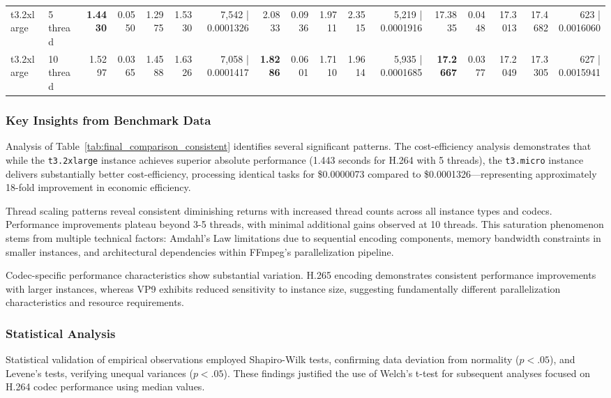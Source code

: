 \documentclass[conference]{IEEEtran}
\begin{document}
\begin{table}[h]
{\begin{tabular}{ll|rrrrr|rrrrr|rrrrr}
				t3.2xlarge & 5 thread & \textbf{1.4430} & 0.0550 & 1.2975 & 1.5330 & 7,542 | 0.0001326 & 2.0833 & 0.0936 & 1.9711 & 2.3515 & 5,219 | 0.0001916 & 17.3835 & 0.0448 & 17.3013 & 17.4682 & 623 | 0.0016060 \\
				t3.2xlarge & 10 thread & 1.5297 & 0.0365 & 1.4588 & 1.6326 & 7,058 | 0.0001417 & \textbf{1.8286} & 0.0601 & 1.7110 & 1.9614 & 5,935 | 0.0001685 & \textbf{17.2667} & 0.0377 & 17.2049 & 17.3305 & 627 | 0.0015941 \\
				\bottomrule
			\end{tabular}
		}
	\end{table}
	
	\subsubsection{Key Insights from Benchmark Data}
	
	Analysis of Table~\ref{tab:final_comparison_consistent} identifies several significant patterns. The cost-efficiency analysis demonstrates that while the \texttt{t3.2xlarge} instance achieves superior absolute performance (1.443 seconds for H.264 with 5 threads), the \texttt{t3.micro} instance delivers substantially better cost-efficiency, processing identical tasks for \$0.0000073 compared to \$0.0001326—representing approximately 18-fold improvement in economic efficiency.
	
	Thread scaling patterns reveal consistent diminishing returns with increased thread counts across all instance types and codecs. Performance improvements plateau beyond 3-5 threads, with minimal additional gains observed at 10 threads. This saturation phenomenon stems from multiple technical factors: Amdahl's Law limitations due to sequential encoding components, memory bandwidth constraints in smaller instances, and architectural dependencies within FFmpeg's parallelization pipeline.
	
	Codec-specific performance characteristics show substantial variation. H.265 encoding demonstrates consistent performance improvements with larger instances, whereas VP9 exhibits reduced sensitivity to instance size, suggesting fundamentally different parallelization characteristics and resource requirements.
	
	\subsubsection{Statistical Analysis}
	
	Statistical validation of empirical observations employed Shapiro-Wilk tests, confirming data deviation from normality ($p < .05$), and Levene's tests, verifying unequal variances ($p < .05$). These findings justified the use of Welch's t-test for subsequent analyses focused on H.264 codec performance using median values.
	
\end{document}
